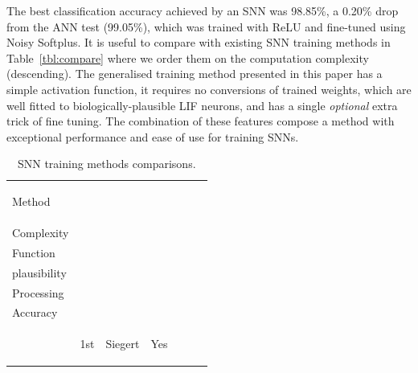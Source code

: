 \documentclass{article}
\newenvironment{mycell}[1]
{
	\begin{minipage}{#1}
		\begin{center}
			\vspace*{0.15cm}
		}
		{
			\vspace*{0.1cm}
		\end{center}
	\end{minipage}
}
\begin{document}
The best classification accuracy achieved by an SNN was 98.85\%, a 0.20\% drop from the ANN test (99.05\%), which was trained with ReLU and fine-tuned using Noisy Softplus.
It is useful to compare with existing SNN training methods in Table~\ref{tbl:compare} where we order them on the computation complexity (descending).   
The generalised training method presented in this paper has a simple activation function, it requires no conversions of trained weights, which are well fitted to biologically-plausible LIF neurons, and has a single \emph{optional} extra trick of fine tuning. The combination of these features compose a method with exceptional performance and ease of use for training SNNs.

\begin{table}[thb!]
  \caption{SNN training methods comparisons.}
  \begin{center}
    \bgroup
    \def\arraystretch{1.4}
    \begin{tabular}{l c c c c c c}
      \begin{mycell}{1cm} Method \end{mycell} & 
      \begin{mycell}{1.8cm} Computation\\Complexity \end{mycell} & 
      \begin{mycell}{1.8cm}Activation\\Function\end{mycell} &
      \begin{mycell}{1.8cm} Biologically-\\plausibility \end{mycell} &  
      \begin{mycell}{1.8cm} Additional\\Processing \end{mycell} & 
      \begin{mycell}{1.8cm} Classification\\Accuracy \end{mycell} 
      \\
      \hline
      \begin{mycell}{1cm} \cite{Jug_etal_2012} \end{mycell} & 
      \begin{mycell}{1.8cm} 1st \end{mycell} & 
      \begin{mycell}{1.8cm}Siegert \end{mycell} &
      \begin{mycell}{1.8cm} Yes \end{mycell} &  

\end{tabular}
\end{center}
\end{table}
\end{document}
